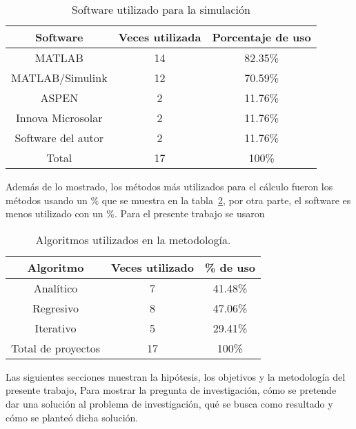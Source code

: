     \begin{table}[H]
        \centering
        \caption{Software utilizado para la simulación} 
        \label{tab:softedoarte}
        \begin{tabular}{ccc}
            \hline
            Software & Veces utilizada & Porcentaje de uso \\
            \hline
            MATLAB & 14 & 82.35\% \\
            MATLAB/Simulink & 12 & 70.59\% \\
            ASPEN & 2 & 11.76\% \\
            Innova Microsolar & 2 & 11.76\% \\
            Software del autor & 2 & 11.76\% \\
            Total & 17 & 100\% \\
            \hline
        \end{tabular}
    \end{table}


Además de lo mostrado, los métodos más utilizados para el cálculo fueron los métodos usando un \% que se muestra en la tabla~\ref{tab:algoritmosusados}, por otra parte, el software  es menos utilizado con un \%. Para el presente trabajo se usaron 

\begin{table}[H]
    \centering
    \caption{Algoritmos utilizados en la metodología.}
    \label{tab:algoritmosusados}

    \begin{tabular}{ccc}
        \hline
        Algoritmo & Veces utilizado & \% de uso \\
        \hline
        Analítico & 7 & 41.48\% \\
        Regresivo & 8 & 47.06\% \\
        Iterativo & 5 &  29.41\% \\
        Total de proyectos & 17 & 100\% \\
        \hline
    \end{tabular}
\end{table}


Las siguientes secciones muestran la hipótesis, los objetivos y la metodología del presente trabajo, Para mostrar la pregunta de investigación, cómo se pretende dar una solución al problema de investigación, qué se busca como resultado y cómo se planteó dicha solución. 

\pagebreak

